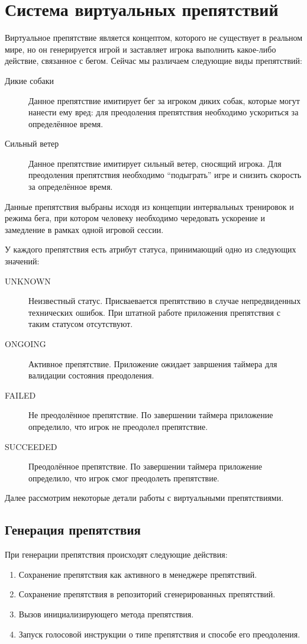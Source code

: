\section{Система виртуальных препятствий}
\label{sec:obstacles}
Виртуальное препятствие является концептом, которого не существует в реальном мире, но он генерируется игрой и заставляет игрока выполнить какое-либо действие, связанное с бегом. Сейчас мы различаем следующие виды препятствий:
\begin{description}
	\item[Дикие собаки] Данное препятствие имитирует бег за игроком диких собак, которые могут нанести ему вред: для преодоления препятствия необходимо ускориться за определённое время.
	\item[Сильный ветер] Данное препятствие имитирует сильный ветер, сносящий игрока. Для преодоления препятствия необходимо ``подыграть'' игре и снизить скорость за определённое время.
\end{description}
\smallskip
Данные препятствия выбраны исходя из концепции интервальных тренировок и режима бега, при котором человеку необходимо чередовать ускорение и замедление в рамках одной игровой сессии.

У каждого препятствия есть атрибут статуса, принимающий одно из следующих значений:
\begin{description}
	\item[UNKNOWN] Неизвестный статус. Присваевается препятствию в случае непредвиденных технических ошибок. При штатной работе приложения препятствия с таким статусом отсутствуют.
	\item[ONGOING] Активное препятствие. Приложение ожидает завршения таймера для валидации состояния преодоления.
	\item[FAILED] Не преодолённое препятствие. По завершении таймера приложение определило, что игрок не преодолел препятствие.
	\item[SUCCEEDED] Преодолённое препятствие. По завершении таймера приложение определило, что игрок смог преодолеть препятствие.
\end{description}
\smallskip
Далее рассмотрим некоторые детали работы с виртуальными препятствиями.
\subsection*{Генерация препятствия}
При генерации препятствия происходят следующие действия:
\begin{enumerate}
	\item Сохранение препятствия как активного в менеджере препятствий.
	\item Сохранение препятствия в репозиторий сгенерированных препятствий.
	\item Вызов инициализирующего метода препятствия.
	\item Запуск голосовой инструкции о типе препятствия и способе его преодоления.
\end{enumerate}

